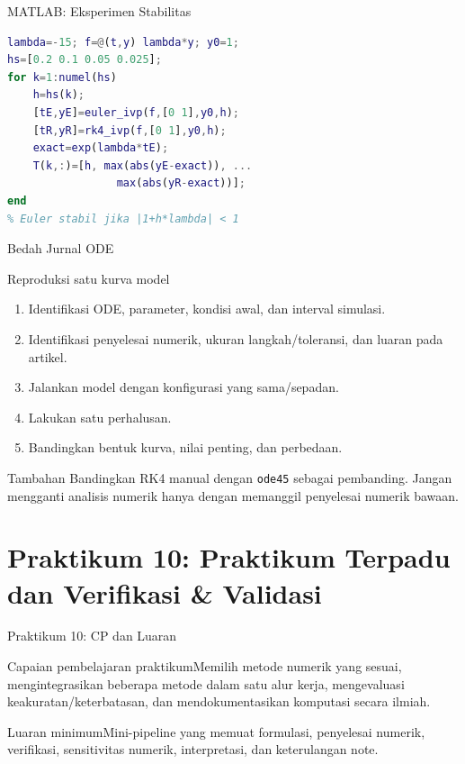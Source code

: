 \documentclass[slides,english,noindex,lean,nobackpage,nocopyright,noupdate,nosummary]{enacom}
\newcommand{\CPBox}[1]{\begin{block}{Capaian pembelajaran praktikum}#1\end{block}}
\newcommand{\OutBox}[1]{\begin{exampleblock}{Luaran minimum}#1\end{exampleblock}}
\begin{document}
\begin{frame}{MATLAB: Eksperimen Stabilitas}
\begin{lstlisting}[language=Matlab]
lambda=-15; f=@(t,y) lambda*y; y0=1;
hs=[0.2 0.1 0.05 0.025];
for k=1:numel(hs)
    h=hs(k);
    [tE,yE]=euler_ivp(f,[0 1],y0,h);
    [tR,yR]=rk4_ivp(f,[0 1],y0,h);
    exact=exp(lambda*tE);
    T(k,:)=[h, max(abs(yE-exact)), ...
                 max(abs(yR-exact))];
end
% Euler stabil jika |1+h*lambda| < 1
\end{lstlisting}
\end{frame}

\begin{frame}{Bedah Jurnal ODE}
\begin{block}{Reproduksi satu kurva model}
\begin{enumerate}
\item Identifikasi ODE, parameter, kondisi awal, dan interval simulasi.
\item Identifikasi penyelesai numerik, ukuran langkah/toleransi, dan luaran pada artikel.
\item Jalankan model dengan konfigurasi yang sama/sepadan.
\item Lakukan satu perhalusan.
\item Bandingkan bentuk kurva, nilai penting, dan perbedaan.
\end{enumerate}
\end{block}
\begin{exampleblock}{Tambahan}
Bandingkan RK4 manual dengan \texttt{ode45} sebagai pembanding. Jangan mengganti analisis numerik hanya dengan memanggil penyelesai numerik bawaan.
\end{exampleblock}
\end{frame}

\section{Praktikum 10: Praktikum Terpadu dan Verifikasi \& Validasi}

\begin{frame}{Praktikum 10: CP dan Luaran}
\CPBox{Memilih metode numerik yang sesuai, mengintegrasikan beberapa metode dalam satu alur kerja, mengevaluasi keakuratan/keterbatasan, dan mendokumentasikan komputasi secara ilmiah.}
\OutBox{Mini-pipeline yang memuat formulasi, penyelesai numerik, verifikasi, sensitivitas numerik, interpretasi, dan keterulangan note.}
\end{frame}
\end{document}
